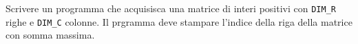 \begin{Exercise}[label={ex:riga_somma_massima}]
		Scrivere un programma che acquisisca una matrice di interi positivi con \texttt{DIM\_R} righe e \texttt{DIM\_C} colonne. Il prgramma deve stampare l'indice della riga della matrice con somma massima.
  	
\end{Exercise}

\begin{Answer}[ref={ex:riga_somma_massima}]
  	
\end{Answer}
